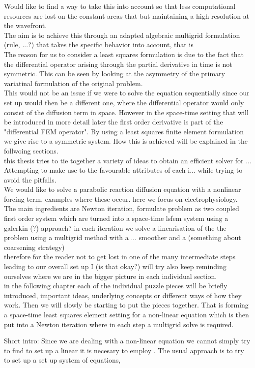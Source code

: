 \documentclass[../draft_1.tex]{subfiles}
\begin{document}
Would like to find a way to take this into account so that less computational resources are lost on the constant areas that but maintaining a high resolution at the wavefront. 
\smallskip
\\
The aim is to achieve this through an adapted algebraic multigrid formulation (rule, ...?) that takes the specific behavior into account, that is 
\smallskip
\\
The reason for us to consider a least squares formulation is due to the fact that the differential operator arising through the partial derivative in time is not symmetric. This can be seen by looking at the asymmetry of the primary variatinal formulation of the original problem. 
\smallskip
\\
This would not be an issue if we were to solve the equation sequentially since our set up would then be a different one, where the differential operator would only consist of the diffusion term in space. However in the space-time setting that will be introduced in more detail later the first order derivative is part of the "differential FEM operator". By using a least squares finite element formulation we give rise to a symmetric system. How this is achieved will be explained in the follwoing sections.   
\\
this thesis tries to tie together a variety of ideas to obtain an efficient solver for ... Attempting to make use to the favourable attributes of each i... while trying to avoid the pitfalls. 
\bigskip
\\
We would like to solve a parabolic reaction diffusion equation with a nonlinear forcing term, examples where these occur. here we focus on electrophysiology. \\
The main ingredients are Newton iteration, formulate problem as two coupled first order system which are turned into a space-time lsfem system using a galerkin (?) approach? in each iteration we solve a linearisation of the the problem using a multigrid method with a ... smoother and a (something about coarsening strategy)
\bigskip
\\
therefore for the reader not to get lost in one of the many intermediate steps leading to our overall set up I (is that okay?) will try also keep reminding ourselves where we are in the bigger picture in each individual section. 
\\ 
in the following chapter each of the individual puzzle pieces will be briefly introduced, important ideas, underlying concepts or different ways of how they work. Then we will slowly be starting to put the pieces together. That is forming a space-time least squares element setting for a non-linear equation which is then put into a Newton iteration where in each step a multigrid solve is required. 

Short intro: Since we are dealing with a non-linear equation we cannot simply try to find to set up a linear it is necesary to employ . The usual approach is to try to set up a set up system of equations, 
\end{document}
